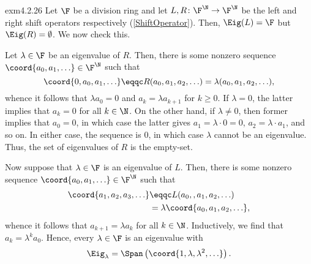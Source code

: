 \begin{exm}{}{exm4.2.26}
	Let $\F$ be a division ring and let $L,R\colon \F ^{\N}\rightarrow \F ^{\N}$ be the left and right shift operators respectively (\cref{ShiftOperator}).  Then, $\Eig (L)=\F$ but $\Eig (R)=\emptyset$.  We now check this.
	
	Let $\lambda \in \F$ be an eigenvalue of $R$.  Then, there is some nonzero sequence $\coord{a_0,a_1,\ldots }\in \F ^{\N}$ such that
	\begin{equation}
		\coord{0,a_0,a_1,\ldots }\eqqc R(a_0,a_1,a_2,\ldots )=\lambda (a_0,a_1,a_2,\ldots ),
	\end{equation}
	whence it follows that $\lambda a_0=0$ and $a_k=\lambda a_{k+1}$ for $k\geq 0$.  If $\lambda =0$, the latter implies that $a_k=0$ for all $k\in \N$.  On the other hand, if $\lambda \neq 0$, then former implies that $a_0=0$, in which case the latter gives $a_1=\lambda \cdot 0=0$, $a_2=\lambda \cdot a_1$, and so on.  In either case, the sequence is $0$, in which case $\lambda$ cannot be an eigenvalue.  Thus, the set of eigenvalues of $R$ is the empty-set.
	
	Now suppose that $\lambda \in \F$ is an eigenvalue of $L$.  Then, there is some nonzero sequence $\coord{a_0,a_1,\ldots}\in \F ^{\N}$ such that
	\begin{equation}
		\begin{split}
			\coord{a_1,a_2,a_3,\ldots} & \eqqc L(a_0,,a_1,a_2,\ldots) \\
			& =\lambda \coord{a_0,a_1,a_2,\ldots},
		\end{split}
	\end{equation}
	whence it follows that $a_{k+1}=\lambda a_k$ for all $k\in \N$.  Inductively, we find that $a_k=\lambda ^ka_0$.  Hence, every $\lambda \in \F$ is an eigenvalue with
	\begin{equation}\label{eqn5.2}
		\Eig _{\lambda}=\Span \left( \coord{1,\lambda ,\lambda ^2,\ldots}\right) .
	\end{equation}
\end{exm}


